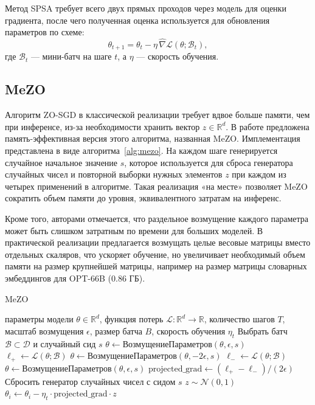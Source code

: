 \documentclass[LI,KR]{HSEUniversity}
\begin{document}
Метод SPSA требует всего двух прямых проходов через модель для оценки градиента, после чего полученная оценка используется для обновления параметров по схеме:
$$
\theta_{t+1} = \theta_t - \eta\, \widehat{\nabla} \mathcal{L}(\theta; \mathcal{B}_t),
$$
где $\mathcal{B}_t$ — мини-батч на шаге $t$, а $\eta$ — скорость обучения.

\subsection{MeZO}

Алгоритм ZO-SGD в классической реализации требует вдвое больше памяти, чем при инференсе, из-за необходимости хранить вектор $z \in \mathbb{R}^d$.
В работе \cite{mezo} предложена память-эффективная версия этого алгоритма, названная MeZO.
Имплементация представлена в виде алгоритма~\ref{alg:mezo}.
На каждом шаге генерируется случайное начальное значение $s$, которое используется для сброса генератора случайных чисел и повторной выборки нужных элементов $z$ при каждом из четырех применений в алгоритме.
Такая реализация «на месте» позволяет MeZO сократить объем памяти до уровня, эквивалентного затратам на инференс.

Кроме того, авторами отмечается, что раздельное возмущение каждого параметра может быть слишком затратным по времени для больших моделей.
В практической реализации предлагается возмущать целые весовые матрицы вместо отдельных скаляров, что ускоряет обучение,
но увеличивает необходимый объем памяти на размер крупнейшей матрицы, например на размер матрицы словарных эмбеддингов для OPT-66B (0.86 ГБ).

\begin{algorithm}[H]
\caption{MeZO}
\begin{algorithmic}[1]
\Require параметры модели $\theta \in \mathbb{R}^d$, функция потерь $\mathcal{L} : \mathbb{R}^d \rightarrow \mathbb{R}$, количество шагов $T$, масштаб возмущения $\epsilon$, размер батча $B$, скорость обучения $\eta_t$
    \State Выбрать батч $\mathcal{B} \subset \mathcal{D}$ и случайный сид $s$
    \State $\theta \leftarrow \text{ВозмущениеПараметров}(\theta, \epsilon, s)$
    \State $\ell_+ \leftarrow \mathcal{L}(\theta; \mathcal{B})$
    \State $\theta \leftarrow \text{ВозмущениеПараметров}(\theta, -2\epsilon, s)$
    \State $\ell_- \leftarrow \mathcal{L}(\theta; \mathcal{B})$
    \State $\theta \leftarrow \text{ВозмущениеПараметров}(\theta, \epsilon, s)$ 
    \State $\text{projected\_grad} \leftarrow (\ell_+ - \ell_-)/(2\epsilon)$
    \State Сбросить генератор случайных чисел с сидом $s$ 
        \State $z \sim \mathcal{N}(0, 1)$
        \State $\theta_i \leftarrow \theta_i - \eta_t \cdot \text{projected\_grad} \cdot z$
    \EndFor
\EndFor
\end{algorithmic}
\label{alg:mezo}
\end{algorithm}
\end{document}
